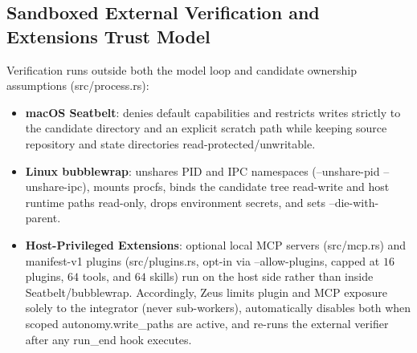\documentclass[10pt,letterpaper]{article}
\newcommand{\code}[1]{\textnormal{\small\ttfamily #1}}
\begin{document}
\subsection{Sandboxed External Verification and Extensions Trust Model}

Verification runs outside both the model loop and candidate ownership assumptions (\code{src/process.rs}):
\begin{itemize}[leftmargin=1.4em,itemsep=2pt,topsep=2pt]
  \item \textbf{macOS Seatbelt}: denies default capabilities and restricts writes strictly to the candidate directory and an explicit scratch path while keeping source repository and state directories read-protected/unwritable.
  \item \textbf{Linux \code{bubblewrap}}: unshares PID and IPC namespaces (\code{--unshare-pid --unshare-ipc}), mounts procfs, binds the candidate tree read-write and host runtime paths read-only, drops environment secrets, and sets \code{--die-with-parent}.
  \item \textbf{Host-Privileged Extensions}: optional local MCP servers (\code{src/mcp.rs}) and manifest-v1 plugins (\code{src/plugins.rs}, opt-in via \code{--allow-plugins}, capped at $16$ plugins, $64$ tools, and $64$ skills) run on the host side rather than inside Seatbelt/bubblewrap. Accordingly, Zeus limits plugin and MCP exposure solely to the integrator (never sub-workers), automatically disables both when scoped \code{autonomy.write\_paths} are active, and re-runs the external verifier after any \code{run\_end} hook executes.
\end{itemize}
\end{document}
